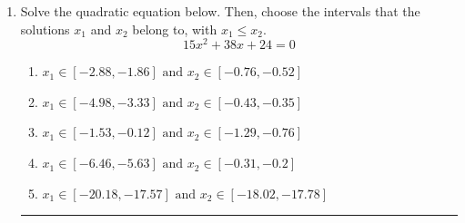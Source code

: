 \documentclass[14pt]{extbook}
\newcommand{\litem}[1]{\item#1\hspace*{-1cm}\rule{\textwidth}{0.4pt}}
\begin{document}
\begin{enumerate}
{\begin{enumerate}[label=\Alph*.]
\end{enumerate} }
\litem{
Solve the quadratic equation below. Then, choose the intervals that the solutions $x_1$ and $x_2$ belong to, with $x_1 \leq x_2$.\[ 15x^{2} +38 x + 24 = 0 \]\begin{enumerate}[label=\Alph*.]
\item \( x_1 \in [-2.88, -1.86] \text{ and } x_2 \in [-0.76, -0.52] \)
\item \( x_1 \in [-4.98, -3.33] \text{ and } x_2 \in [-0.43, -0.35] \)
\item \( x_1 \in [-1.53, -0.12] \text{ and } x_2 \in [-1.29, -0.76] \)
\item \( x_1 \in [-6.46, -5.63] \text{ and } x_2 \in [-0.31, -0.2] \)
\item \( x_1 \in [-20.18, -17.57] \text{ and } x_2 \in [-18.02, -17.78] \)


\end{enumerate}}
\end{enumerate}
\end{document}
